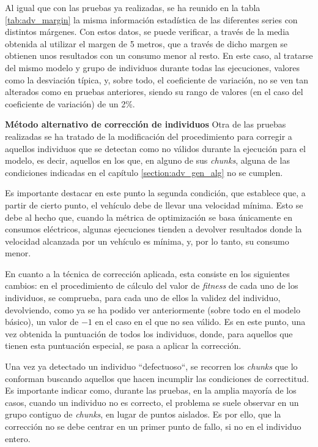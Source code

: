 \documentclass[11pt,spanish,listoffigures,listoftables]{tfgetsinf}
\begin{document}
Al igual que con las pruebas ya realizadas, se ha reunido en la tabla \ref{tab:adv_margin} la misma información estadística de las diferentes series con distintos márgenes. Con estos datos, se puede verificar, a través de la media obtenida al utilizar el margen de 5 metros, que a través de dicho margen se obtienen unos resultados con un consumo menor al resto. En este caso, al tratarse del mismo modelo y grupo de individuos durante todas las ejecuciones, valores como la desviación típica, y, sobre todo, el coeficiente de variación, no se ven tan alterados como en pruebas anteriores, siendo su rango de valores (en el caso del coeficiente de variación) de un 2\%.\newline

\textbf{Método alternativo de corrección de individuos}\newline
Otra de las pruebas realizadas se ha tratado de la modificación del procedimiento para corregir a aquellos individuos que se detectan como no válidos durante la ejecución para el modelo, es decir, aquellos en los que, en alguno de sus \textit{chunks}, alguna de las  condiciones indicadas en el capítulo \ref{section:adv_gen_alg} no se cumplen.

Es importante destacar en este punto la segunda condición, que establece que, a partir de cierto punto, el vehículo debe de llevar una velocidad mínima. Esto se debe al hecho que, cuando la métrica de optimización se basa únicamente en consumos eléctricos, algunas ejecuciones tienden a devolver resultados donde la velocidad alcanzada por un vehículo es mínima, y, por lo tanto, su consumo menor.

En cuanto a la técnica de corrección aplicada, esta consiste en los siguientes cambios: en el procedimiento de cálculo del valor de \textit{fitness} de cada uno de los individuos, se comprueba, para cada uno de ellos la validez del individuo, devolviendo, como ya se ha podido ver anteriormente (sobre todo en el modelo básico), un valor de $-1$ en el caso en el que no sea válido. Es en este punto, una vez obtenida la puntuación de todos los individuos, donde, para aquellos que tienen esta puntuación especial, se pasa a aplicar la corrección.

Una vez ya detectado un individuo ``defectuoso``, se recorren los \textit{chunks} que lo conforman buscando aquellos que hacen incumplir las condiciones de correctitud. Es importante indicar como, durante las pruebas, en la amplia mayoría de los casos, cuando un individuo no es correcto, el problema se suele observar en un grupo contiguo de \textit{chunks}, en lugar de puntos aislados. Es por ello, que la corrección no se debe centrar en un primer punto de fallo, si no en el individuo entero.
\end{document}
